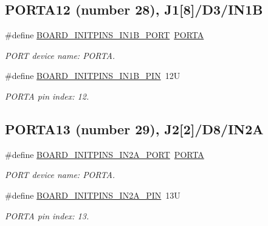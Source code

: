 \subsection*{P\+O\+R\+T\+A12 (number 28), J1\mbox{[}8\mbox{]}/\+D3/\+I\+N1B}
\begin{DoxyCompactItemize}
\item 
\mbox{\label{group__pin__mux_ga3b875ea877ce3a334f666128cc219e5d}} 
\#define \mbox{\hyperlink{group__pin__mux_ga3b875ea877ce3a334f666128cc219e5d}{B\+O\+A\+R\+D\+\_\+\+I\+N\+I\+T\+P\+I\+N\+S\+\_\+\+I\+N1\+B\+\_\+\+P\+O\+RT}}~\mbox{\hyperlink{group___p_o_r_t___peripheral___access___layer_ga7c8a7f98a98d8cb125dd57a66720ab30}{P\+O\+R\+TA}}
\begin{DoxyCompactList}\small\item\em P\+O\+RT device name\+: P\+O\+R\+TA. \end{DoxyCompactList}\item 
\mbox{\label{group__pin__mux_gaec86049b255f6c97fd6d3679a5308e22}} 
\#define \mbox{\hyperlink{group__pin__mux_gaec86049b255f6c97fd6d3679a5308e22}{B\+O\+A\+R\+D\+\_\+\+I\+N\+I\+T\+P\+I\+N\+S\+\_\+\+I\+N1\+B\+\_\+\+P\+IN}}~12U
\begin{DoxyCompactList}\small\item\em P\+O\+R\+TA pin index\+: 12. \end{DoxyCompactList}\end{DoxyCompactItemize}
\subsection*{P\+O\+R\+T\+A13 (number 29), J2\mbox{[}2\mbox{]}/\+D8/\+I\+N2A}
\begin{DoxyCompactItemize}
\item 
\mbox{\label{group__pin__mux_ga72db835e36e49d5b62d8c36f706cf441}} 
\#define \mbox{\hyperlink{group__pin__mux_ga72db835e36e49d5b62d8c36f706cf441}{B\+O\+A\+R\+D\+\_\+\+I\+N\+I\+T\+P\+I\+N\+S\+\_\+\+I\+N2\+A\+\_\+\+P\+O\+RT}}~\mbox{\hyperlink{group___p_o_r_t___peripheral___access___layer_ga7c8a7f98a98d8cb125dd57a66720ab30}{P\+O\+R\+TA}}
\begin{DoxyCompactList}\small\item\em P\+O\+RT device name\+: P\+O\+R\+TA. \end{DoxyCompactList}\item 
\mbox{\label{group__pin__mux_ga064b95d6e24f705131fec66765204fbf}} 
\#define \mbox{\hyperlink{group__pin__mux_ga064b95d6e24f705131fec66765204fbf}{B\+O\+A\+R\+D\+\_\+\+I\+N\+I\+T\+P\+I\+N\+S\+\_\+\+I\+N2\+A\+\_\+\+P\+IN}}~13U
\begin{DoxyCompactList}\small\item\em P\+O\+R\+TA pin index\+: 13. \end{DoxyCompactList}\end{DoxyCompactItemize}
